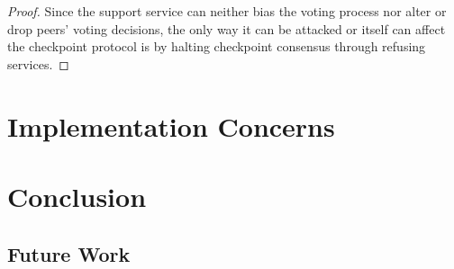 \documentclass[conference]{IEEEtran}
\begin{document}
\begin{proof}
Since the support service can neither bias the voting process nor alter or drop peers' voting decisions, the only way it can be attacked or itself can affect the checkpoint protocol is by halting checkpoint consensus through refusing services.           
\end{proof}      

\section{Implementation Concerns}
\label{s-implementation}

\section{Conclusion}
\label{s-conclusion}
\subsection{Future Work}
 


\end{document}
